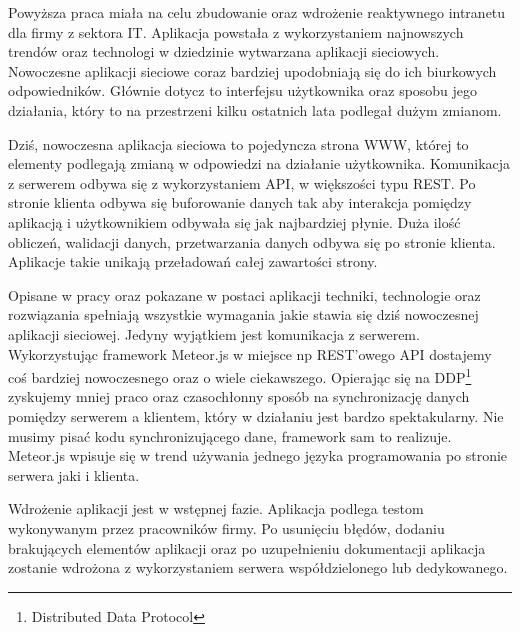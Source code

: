 Powyższa praca miała na celu zbudowanie oraz wdrożenie reaktywnego intranetu dla firmy z sektora IT. Aplikacja powstała z wykorzystaniem najnowszych trendów oraz technologi w dziedzinie wytwarzana aplikacji sieciowych. Nowoczesne aplikacji sieciowe coraz bardziej upodobniają się do ich biurkowych odpowiedników. Głównie dotycz to interfejsu użytkownika oraz sposobu jego działania, który to na przestrzeni kilku ostatnich lata podlegał dużym zmianom. 

Dziś, nowoczesna aplikacja sieciowa to pojedyncza strona WWW, której to elementy podlegają zmianą w odpowiedzi na działanie użytkownika. Komunikacja z serwerem odbywa się z wykorzystaniem API, w większości typu REST. Po stronie klienta odbywa się buforowanie danych tak aby interakcja pomiędzy aplikacją i użytkownikiem odbywała się jak najbardziej płynie. Duża ilość obliczeń, walidacji danych, przetwarzania danych odbywa się po stronie klienta. Aplikacje takie unikają przeładowań całej zawartości strony. 

Opisane w pracy oraz pokazane w postaci aplikacji techniki, technologie oraz rozwiązania spełniają wszystkie wymagania jakie stawia się dziś nowoczesnej aplikacji sieciowej. Jedyny wyjątkiem jest komunikacja z serwerem. Wykorzystując framework Meteor.js w miejsce np REST'owego API dostajemy coś bardziej nowoczesnego oraz o wiele ciekawszego. Opierając się na DDP\footnote{Distributed Data Protocol} zyskujemy mniej praco oraz czasochłonny  sposób na synchronizację danych pomiędzy serwerem a klientem, który w działaniu jest bardzo spektakularny. Nie musimy pisać kodu synchronizującego dane, framework sam to realizuje. Meteor.js wpisuje się w trend używania jednego języka programowania po stronie serwera jaki i klienta.

Wdrożenie aplikacji jest w wstępnej fazie. Aplikacja podlega testom wykonywanym przez pracowników firmy. Po usunięciu błędów, dodaniu brakujących elementów aplikacji oraz po uzupełnieniu dokumentacji aplikacja zostanie wdrożona z wykorzystaniem serwera współdzielonego lub dedykowanego. 